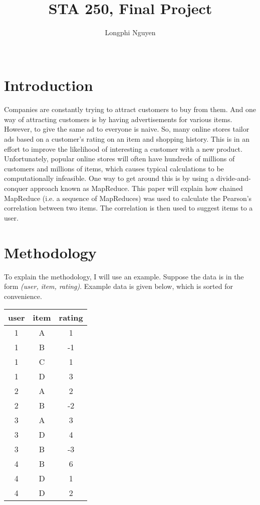 \documentclass{article}
\title{STA 250, Final Project}
\author{Longphi Nguyen\\ \\}
\begin{document}
\maketitle

\newpage

\section{Introduction}
Companies are constantly trying to attract customers to buy from them. And one way of attracting customers is by having advertisements for various items. However, to give the same ad to everyone is naive. So, many online stores tailor ads based on a customer's rating on an item and shopping history. This is in an effort to improve the likelihood of interesting a customer with a new product. Unfortunately, popular online stores will often have hundreds of millions of customers and millions of items, which causes typical calculations to be computationally infeasible. One way to get around this is by using a divide-and-conquer approach known as MapReduce. This paper will explain how chained MapReduce (i.e. a sequence of MapReduces) was used to calculate the Pearson's correlation between two items. The correlation is then used to suggest items to a user.

\section{Methodology}

To explain the methodology, I will use an example. Suppose the data is in the form \textit{(user, item, rating)}. Example data is given below, which is sorted for convenience.


\begin{center}
\begin{tabular}{|c|c|c|}
\hline
user & item & rating\\
\hline
1 & A & 1 \\
1 & B & -1 \\
1 & C & 1\\
1 & D & 3\\
2 & A & 2\\
2 & B & -2\\
3 & A & 3\\
3 & D & 4\\
3 & B & -3\\
4 & B & 6\\
4 & D & 1\\
4 & D & 2\\
\hline
\end{tabular}
\end{center}
\end{document}
